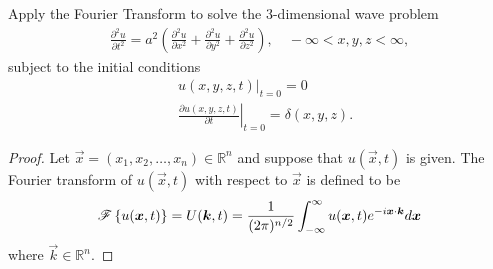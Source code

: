 \begin{problem}{8}
  Apply the Fourier Transform to solve the 3-dimensional wave problem
  \begin{align*}
    \frac{\partial^2 u}{\partial t^2} = a^2\left(\frac{\partial^2 u}{\partial x^2} + \frac{\partial^2 u}{\partial y^2} + \frac{\partial^2 u}{\partial z^2}\right), \quad -\infty < x, y, z < \infty,
  \end{align*}
  subject to the initial conditions
  \begin{align*}
    &u(x, y, z, t)\rvert_{t=0} = 0 \\
    &\left.\frac{\partial u(x, y, z, t)}{\partial t}\right\rvert_{t=0} = \delta(x, y, z).
  \end{align*}
\end{problem}

\begin{proof}
  Let $\vec{x} = (x_1, x_2, \dots, x_n)\in \mathbb{R}^n$ and suppose that $u(\vec{x}, t)$ is given. The
  Fourier transform of $u(\vec{x}, t)$ with respect to $\vec{x}$ is defined to be
  \begin{align}\label{multifourier}
    \mathscr{F}\left\{ {u(\boldsymbol{x}, t)} \right\} = U(\boldsymbol{k}, t) = \frac{1}{(2\pi)^{n/2}}\int_{-\infty}^\infty u(\boldsymbol{x}, t) e^{-i\boldsymbol{x}\cdot\boldsymbol{k}} d\boldsymbol{x}
  \end{align}
  where $\vec{k}\in\mathbb{R}^n$.


\end{proof}
